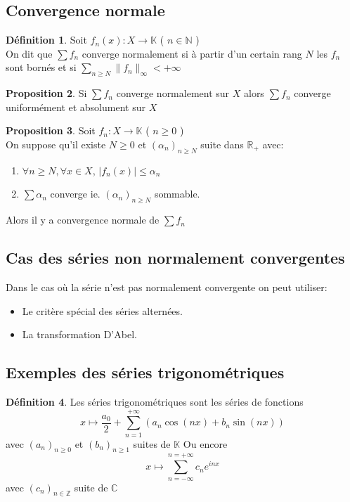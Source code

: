 \documentclass[10pt,a4paper]{article}
\theoremstyle{definition}
\newtheorem{proposition}{Proposition}[section]
\newtheorem{definition}[proposition]{Définition}
\begin{document}
\subsection{Convergence normale}
\begin{definition}
    Soit $f_n(x): X \to \mathbb{K}$ ( $n \in \mathbb{N}$ ) \\
    On dit que $\sum f_n$ converge normalement si à partir d'un certain rang $N$ les $f_n$ sont bornés et si $\sum\limits_{n \geq N} \lVert f_n \rVert_\infty < +\infty$
\end{definition}
\begin{proposition}
    Si $\sum f_n$ converge normalement sur $X$ alors $\sum f_n$ converge uniformément et absolument sur $X$
\end{proposition}
\begin{proposition}
    Soit $f_n: X \to \mathbb{K}$ ( $n \geq 0$ ) \\
    On suppose qu'il existe $N \geq 0$ et $(\alpha_n)_{n \geq N}$ suite dans $\mathbb{R}_+$ avec:
    \begin{enumerate}
        \item $\forall n \geq N, \forall x \in X$, $|f_n(x)| \leq \alpha_n $
        \item $\sum \alpha_n$ converge ie. $(\alpha_n)_{n \geq N}$ sommable.
    \end{enumerate}
    Alors il y a convergence normale de $\sum f_n$
\end{proposition}

\subsection{Cas des séries non normalement convergentes}
\noindent Dans le cas où la série n'est pas normalement convergente on peut utiliser:
\begin{itemize}
    \item Le critère spécial des séries alternées.
    \item La transformation D'Abel.
\end{itemize}

\subsection{Exemples des séries trigonométriques}
\begin{definition}
    Les séries trigonométriques sont les séries de fonctions
    \[x \mapsto \frac{a_0}{2} + \sum_{n = 1}^{+\infty}\left(a_n \cos(nx) + b_n \sin(nx)\right)\]
    avec $(a_n)_{n \geq 0}$ et $(b_n)_{n \geq 1}$ suites de $\mathbb{K}$
    Ou encore
    \[x \mapsto \sum_{n = -\infty}^{n = +\infty}c_n e^{inx}\]
    avec $(c_n)_{n \in \mathbb{Z}}$ suite de $\mathbb{C}$
\end{definition}
\end{document}
